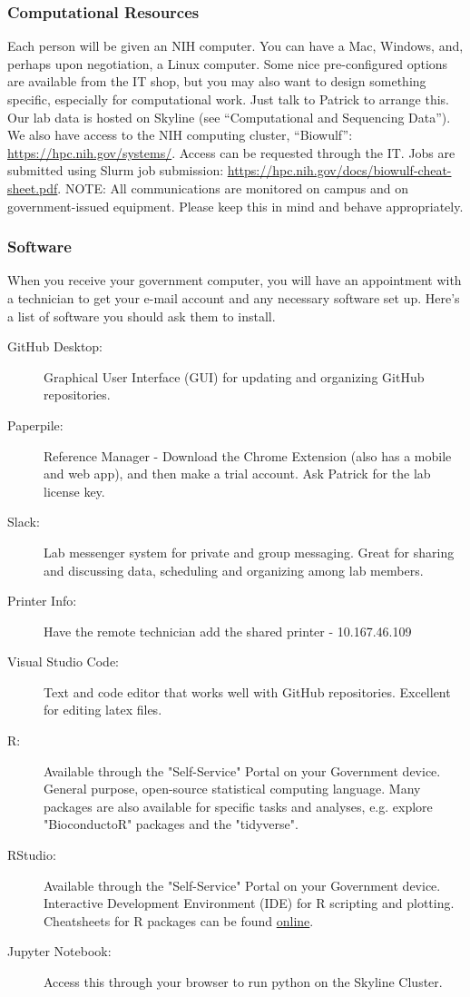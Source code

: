 \documentclass[10pt, letterpaper, twocolumn]{article} %
\begin{document}
\subsubsection{Computational Resources}
Each person will be given an NIH computer. You can have a Mac, Windows, and, perhaps upon negotiation, a Linux computer. Some nice pre-configured options are available from the IT shop, but you may also want to design something specific, especially for computational work. Just talk to Patrick to arrange this.
Our lab data is hosted on Skyline (see ``Computational and Sequencing Data''). We also have access to the NIH computing cluster, “Biowulf”: \href{https://hpc.nih.gov/systems/}{https://hpc.nih.gov/systems/}. Access can be requested through the IT. Jobs are submitted using Slurm job submission: \href{https://hpc.nih.gov/docs/biowulf-cheat-sheet.pdf}{https://hpc.nih.gov/docs/biowulf-cheat-sheet.pdf}.
\newline
NOTE: All communications are monitored on campus and on government-issued equipment. Please keep this in mind and behave appropriately.

\subsubsection{Software}
When you receive your government computer, you will have an appointment with a technician to get your e-mail account and any necessary software set up. Here's a list of software you should ask them to install.
\begin{description}
\item [GitHub Desktop:] Graphical User Interface (GUI) for updating and organizing GitHub repositories.
\item [Paperpile:] Reference Manager - Download the Chrome Extension (also has a mobile and web app), and then make a trial account. Ask Patrick for the lab license key.
\item [Slack:] Lab messenger system for private and group messaging. Great for sharing and discussing data, scheduling and organizing among lab members.
\item [Printer Info:] Have the remote technician add the shared printer - 10.167.46.109
\item [Visual Studio Code:] Text and code editor that works well with GitHub repositories. Excellent for editing latex files.
\item [R:] Available through the "Self-Service" Portal on your Government device. General purpose, open-source statistical computing language. Many packages are also available for specific tasks and analyses, e.g. explore "BioconductoR" packages and the "tidyverse".
\item [RStudio:]Available through the "Self-Service" Portal on your Government device. Interactive Development Environment (IDE) for R scripting and plotting. Cheatsheets for R packages can be found \href{https://www.rstudio.com/resources/cheatsheets/}{online}.
\item [Jupyter Notebook:] Access this through your browser to run python on the Skyline Cluster.
\end{description}
\end{document}

